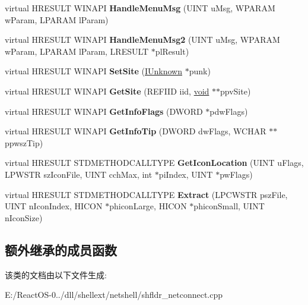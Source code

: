 \begin{DoxyCompactItemize}
\item 
\mbox{\label{class_c_net_con_ui_object_a21d3966ae603e3ebdb955c0eeda564d9}} 
virtual H\+R\+E\+S\+U\+LT W\+I\+N\+A\+PI {\bfseries Handle\+Menu\+Msg} (U\+I\+NT u\+Msg, W\+P\+A\+R\+AM w\+Param, L\+P\+A\+R\+AM l\+Param)
\item 
\mbox{\label{class_c_net_con_ui_object_a430e1066b2f9e0f34c58a96b5fb11f56}} 
virtual H\+R\+E\+S\+U\+LT W\+I\+N\+A\+PI {\bfseries Handle\+Menu\+Msg2} (U\+I\+NT u\+Msg, W\+P\+A\+R\+AM w\+Param, L\+P\+A\+R\+AM l\+Param, L\+R\+E\+S\+U\+LT $\ast$pl\+Result)
\item 
\mbox{\label{class_c_net_con_ui_object_a15b400a048ff28c227d2480deafdd534}} 
virtual H\+R\+E\+S\+U\+LT W\+I\+N\+A\+PI {\bfseries Set\+Site} (\hyperlink{interface_i_unknown}{I\+Unknown} $\ast$punk)
\item 
\mbox{\label{class_c_net_con_ui_object_a01f7dfea48f96a1b60c9e75207dd46e1}} 
virtual H\+R\+E\+S\+U\+LT W\+I\+N\+A\+PI {\bfseries Get\+Site} (R\+E\+F\+I\+ID iid, \hyperlink{interfacevoid}{void} $\ast$$\ast$ppv\+Site)
\item 
\mbox{\label{class_c_net_con_ui_object_a4f99a89335703cb5ca8e7a104b367856}} 
virtual H\+R\+E\+S\+U\+LT W\+I\+N\+A\+PI {\bfseries Get\+Info\+Flags} (D\+W\+O\+RD $\ast$pdw\+Flags)
\item 
\mbox{\label{class_c_net_con_ui_object_ab950a81947ef4b29deac1eb9db1da53e}} 
virtual H\+R\+E\+S\+U\+LT W\+I\+N\+A\+PI {\bfseries Get\+Info\+Tip} (D\+W\+O\+RD dw\+Flags, W\+C\+H\+AR $\ast$$\ast$ppwsz\+Tip)
\item 
\mbox{\label{class_c_net_con_ui_object_a265ada8c38b259c03698ccee2eba2317}} 
virtual H\+R\+E\+S\+U\+LT S\+T\+D\+M\+E\+T\+H\+O\+D\+C\+A\+L\+L\+T\+Y\+PE {\bfseries Get\+Icon\+Location} (U\+I\+NT u\+Flags, L\+P\+W\+S\+TR sz\+Icon\+File, U\+I\+NT cch\+Max, int $\ast$pi\+Index, U\+I\+NT $\ast$pw\+Flags)
\item 
\mbox{\label{class_c_net_con_ui_object_aa518d106c76d4425ec8f43dab6c4f098}} 
virtual H\+R\+E\+S\+U\+LT S\+T\+D\+M\+E\+T\+H\+O\+D\+C\+A\+L\+L\+T\+Y\+PE {\bfseries Extract} (L\+P\+C\+W\+S\+TR psz\+File, U\+I\+NT n\+Icon\+Index, H\+I\+C\+ON $\ast$phicon\+Large, H\+I\+C\+ON $\ast$phicon\+Small, U\+I\+NT n\+Icon\+Size)
\end{DoxyCompactItemize}
\subsection*{额外继承的成员函数}


该类的文档由以下文件生成\+:\begin{DoxyCompactItemize}
\item 
E\+:/\+React\+O\+S-\/0../dll/shellext/netshell/shfldr\+\_\+netconnect.\+cpp\end{DoxyCompactItemize}
